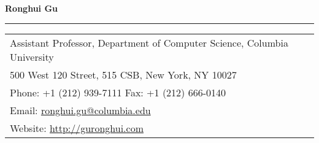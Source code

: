 \documentclass[10pt]{article}
\renewcommand{\section}[1]{
	\vspace{-5pt}
   	\subsection*{\scshape  \bfseries #1}
   }
\newcommand{\makeheading}[2][]%
        { \begin{table} \centering
        		{\LARGE\bfseries #2}\\[-0.15\baselineskip]%
               \rule{\columnwidth}{1pt} \vspace{-30pt}%
           \end{table}
         }
\providecommand*\url[1]{\href{#1}{#1}}
\renewcommand*\url[1]{\href{#1}{#1}}
\providecommand*\email[1]{\href{mailto:#1}{#1}}
\begin{document}
\makeheading{Ronghui Gu}
\thispagestyle{empty}

\vspace{10pt}
\newlength{\rcollength}\setlength{\rcollength}{0.50in}%
%
\begin{tabular}[t]{@{}p{\textwidth-\rcollength}p{\rcollength}}
\\[-1.0em]
Assistant Professor, Department of Computer Science, Columbia University \\
500 West 120 Street, 515 CSB, New York, NY 10027\\ 
Phone: +1 (212) 939-7111 \qquad Fax: +1 (212) 666-0140 \\
Email: \email{ronghui.gu@columbia.edu} \\
Website: \url{http://guronghui.com}
\end{tabular}

\end{document}
